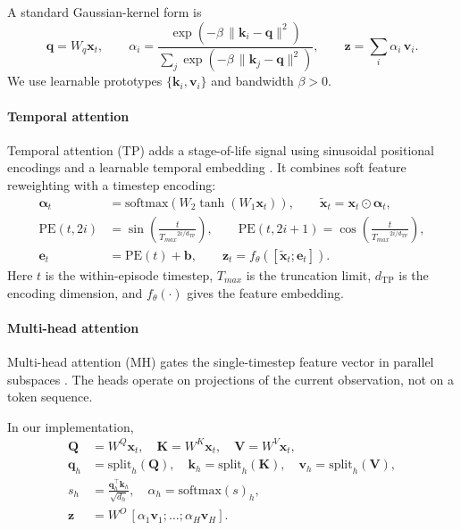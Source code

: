 \documentclass[sn-basic]{sn-jnl}%
\begin{document}
A standard Gaussian-kernel form is
\begin{equation}
        \mathbf{q}=W_q\mathbf{x}_t,\qquad
        \alpha_i = \frac{\exp\left(-\beta\,\lVert \mathbf{k}_i-\mathbf{q}\rVert^2\right)}{\sum_j \exp\left(-\beta\,\lVert \mathbf{k}_j-\mathbf{q}\rVert^2\right)},
        \qquad \mathbf{z}=\sum_i\alpha_i\,\mathbf{v}_i.
\end{equation}
We use learnable prototypes $\{\mathbf{k}_i,\mathbf{v}_i\}$ and bandwidth $\beta>0$.

\paragraph{Temporal attention}
Temporal attention (TP) adds a stage-of-life signal using sinusoidal positional encodings and a learnable temporal embedding \cite{Vaswani2017, Lim2020TFT}. It combines soft feature reweighting with a timestep encoding:
\begin{align}
        \boldsymbol{\alpha}_t &= \mathrm{softmax}\!\left(W_2\tanh\!\left(W_1\mathbf{x}_t\right)\right),
        \qquad \tilde{\mathbf{x}}_t = \mathbf{x}_t\odot\boldsymbol{\alpha}_t,\\
        \mathrm{PE}(t,2i) &= \sin\!\left(\frac{t}{{T_{max}}^{2i/d_{\mathrm{TP}}}}\right),
        \qquad \mathrm{PE}(t,2i+1)=\cos\!\left(\frac{t}{{T_{max}}^{2i/d_{\mathrm{TP}}}}\right),\\
        \mathbf{e}_t &= \mathrm{PE}(t) + \mathbf{b},
        \qquad \mathbf{z}_t = f_\theta\!\left([\tilde{\mathbf{x}}_t;\mathbf{e}_t]\right).
\end{align}
Here $t$ is the within-episode timestep, $T_{max}$ is the truncation limit, $d_{\mathrm{TP}}$ is the encoding dimension, and $f_\theta(\cdot)$ gives the feature embedding.

\paragraph{Multi-head attention}
Multi-head attention (MH) gates the single-timestep feature vector in parallel subspaces \cite{Vaswani2017}. The heads operate on projections of the current observation, not on a token sequence.

In our implementation,
\begin{align}
        \mathbf{Q}&=W^Q\mathbf{x}_t,\quad \mathbf{K}=W^K\mathbf{x}_t,\quad \mathbf{V}=W^V\mathbf{x}_t,\\
        \mathbf{q}_h&=\mathrm{split}_h(\mathbf{Q}),\quad \mathbf{k}_h=\mathrm{split}_h(\mathbf{K}),\quad \mathbf{v}_h=\mathrm{split}_h(\mathbf{V}),\\
        s_h&=\frac{\mathbf{q}_h^\top\mathbf{k}_h}{\sqrt{d_h}},\quad \alpha_h=\mathrm{softmax}(s)_h,\\
        \mathbf{z}&=W^O\,[\alpha_1\mathbf{v}_1;\ldots;\alpha_H\mathbf{v}_H].
\end{align}
\end{document}
